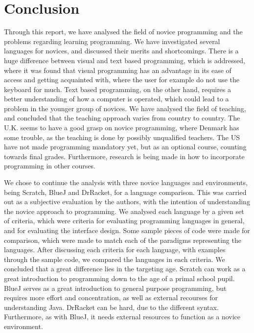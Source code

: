 \chapter{Conclusion}
\label{chap:conclusion}

Through this report, we have analysed the field of novice programming and the problems regarding learning programming. We have investigated several languages for novices, and discussed their merits and shortcomings. There is a huge difference between visual and text based programming, which is addressed, where it was found that visual programming has an advantage in its ease of access and getting acquainted with, where the user for example do not use the keyboard for much. Text based programming, on the other hand, requires a better understanding of how a computer is operated, which could lead to a problem in the younger group of novices. We have analysed the field of teaching, and concluded that the teaching approach varies from country to country. The U.K. seems to have a good grasp on novice programming, where Denmark has some trouble, as the teaching is done by possibly unqualified teachers. The US have not made programming mandatory yet, but as an optional course, counting towards final grades. Furthermore, research is being made in how to incorporate programming in other courses.

We chose to continue the analysis with three novice languages and environments, being Scratch, BlueJ and DrRacket, for a language comparison. This was carried out as a subjective evaluation by the authors, with the intention of understanding the novice approach to programming. We analysed each language by a given set of criteria, which were criteria for evaluating programming languages in general, and for evaluating the interface design. Some sample pieces of code were made for comparison, which were made to match each of the paradigms representing the languages. After discussing each criteria for each language, with examples through the sample code, we compared the languages in each criteria. We concluded that a great difference lies in the targeting age. Scratch can work as a great introduction to programming down to the age of a primal school pupil. BlueJ serves as a great introduction to general purpose programming, but requires more effort and concentration, as well as external recourses for understanding Java. DrRacket can be hard, due to the different syntax. Furthermore, as with BlueJ, it needs external resources to function as a novice environment.



